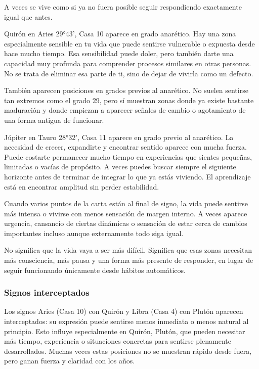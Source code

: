 \documentclass[11pt,a4paper]{article}\usepackage[utf8]{inputenc}
\begin{document}
A veces se vive como si ya no fuera posible seguir respondiendo exactamente igual que antes.

Quirón en Aries 29°43', Casa 10 aparece en grado anarético. Hay una zona especialmente sensible en tu vida que puede sentirse vulnerable o expuesta desde hace mucho tiempo. Esa sensibilidad puede doler, pero también darte una capacidad muy profunda para comprender procesos similares en otras personas. No se trata de eliminar esa parte de ti, sino de dejar de vivirla como un defecto.

También aparecen posiciones en grados previos al anarético. No suelen sentirse tan extremos como el grado 29, pero sí muestran zonas donde ya existe bastante maduración y donde empiezan a aparecer señales de cambio o agotamiento de una forma antigua de funcionar.

Júpiter en Tauro 28°32', Casa 11 aparece en grado previo al anarético. La necesidad de crecer, expandirte y encontrar sentido aparece con mucha fuerza. Puede costarte permanecer mucho tiempo en experiencias que sientes pequeñas, limitadas o vacías de propósito. A veces puedes buscar siempre el siguiente horizonte antes de terminar de integrar lo que ya estás viviendo. El aprendizaje está en encontrar amplitud sin perder estabilidad.

Cuando varios puntos de la carta están al final de signo, la vida puede sentirse más intensa o vivirse con menos sensación de margen interno. A veces aparece urgencia, cansancio de ciertas dinámicas o sensación de estar cerca de cambios importantes incluso aunque externamente todo siga igual.

No significa que la vida vaya a ser más difícil. Significa que esas zonas necesitan más consciencia, más pausa y una forma más presente de responder, en lugar de seguir funcionando únicamente desde hábitos automáticos.


\subsubsection*{Signos interceptados}
Los signos Aries (Casa 10) con Quirón y Libra (Casa 4) con Plutón aparecen interceptados: su expresión puede sentirse menos inmediata o menos natural al principio. Esto influye especialmente en Quirón, Plutón, que pueden necesitar más tiempo, experiencia o situaciones concretas para sentirse plenamente desarrollados. Muchas veces estas posiciones no se muestran rápido desde fuera, pero ganan fuerza y claridad con los años.
\end{document}

